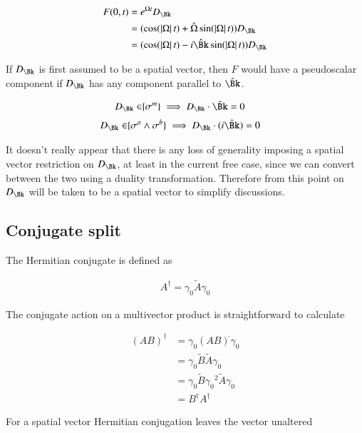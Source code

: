 \begin{align*}
F(0, t) 
&= e^{\Omega t} D_\Bk \\
&= (\cos(\Abs{\Omega} t) + \hat{\Omega} \sin(\Abs{\Omega} t)) D_\Bk \\
&= (\cos(\Abs{\Omega} t) - i \hat{\Bk} \sin(\Abs{\Omega} t)) D_\Bk \\
\end{align*}

If $D_\Bk$ is first assumed to be a spatial vector, then $F$ would have a pseudoscalar component if $D_\Bk$ has any component parallel to $\hat{\Bk}$.

\begin{align}\label{eqn:commutationRequirementVector}
D_\Bk \in \span\{\sigma^m\} \implies D_\Bk \cdot \hat{\Bk} = 0 
\end{align}
\begin{align}\label{eqn:commutationRequirementBiVector}
D_\Bk \in \span\{\sigma^a \wedge \sigma^b\} \implies D_\Bk \cdot (i\hat{\Bk}) = 0
\end{align}

It doesn't really appear that there is any loss of generality imposing a spatial vector restriction on $D_\Bk$, at least in the current free case, since we can convert between the two using a duality transformation.  Therefore from this point on $D_\Bk$ will be taken to be a spatial vector to simplify discussions.

\subsection{Conjugate split}

The Hermitian conjugate is defined as

\begin{align}
A^\dagger = \gamma_0 \tilde{A} \gamma_0
\end{align}

The conjugate action on a multivector product is straightforward to calculate

\begin{align*}
(A B)^\dagger 
&= \gamma_0 (A B)^{\tilde{}} \gamma_0 \\
&= \gamma_0 \tilde{B} \tilde{A} \gamma_0 \\
&= \gamma_0 \tilde{B} {\gamma_0}^2 \tilde{A} \gamma_0 \\
&= B^\dagger A^\dagger
\end{align*}

For a spatial vector Hermitian conjugation leaves the vector unaltered

